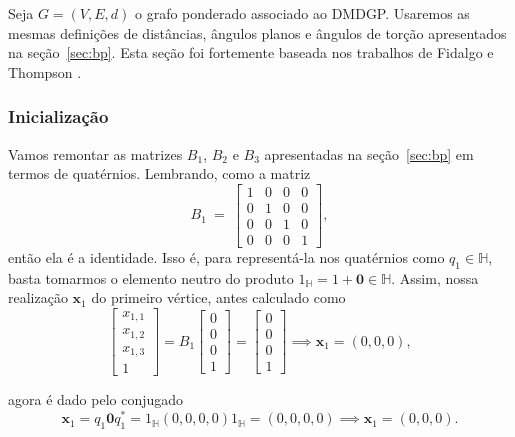 \documentclass[a4paper,12pt]{report}
\theoremstyle{plain}
\theoremstyle{definition}
\begin{document}
	Seja $G = (V,E,d)$ o grafo ponderado associado ao DMDGP. Usaremos as mesmas definições de distâncias, ângulos planos e ângulos de torção apresentados na seção~\ref{sec:bp}. Esta seção foi fortemente baseada nos trabalhos de Fidalgo \cite{agacse?} e Thompson \cite{thompsonBi}.
	
	\subsubsection*{Inicialização}
	
	Vamos remontar as matrizes $B_1$, $B_2$ e $B_3$ apresentadas na seção~\ref{sec:bp} em termos de quatérnios. Lembrando, como a matriz 
	$$B_1\: =\:
	\begin{bmatrix}
		1 & 0 & 0 & 0\\ 
		0 & 1 & 0 & 0\\ 
		0 & 0 & 1 & 0\\ 
		0 & 0 & 0 & 1
	\end{bmatrix},$$
	então ela é a identidade. Isso é, para representá-la nos quatérnios como $q_1 \in \mathbb{H}$, basta tomarmos o elemento neutro do produto $1_\mathbb{H} = 1 + \mathbf 0 \in \mathbb{H}$. Assim, nossa realização $\mathbf x_1$ do primeiro vértice, antes calculado como $$
	\begin{bmatrix}
		x_{1,1}\\ 
		x_{1,2}\\ 
		x_{1,3}\\ 
		1
	\end{bmatrix}
	= B_{1}\begin{bmatrix}
		0\\ 
		0\\ 
		0\\ 
		1
	\end{bmatrix} = 
	\begin{bmatrix}
	0\\ 
	0\\ 
	0\\ 
	1
	\end{bmatrix} \implies \mathbf x_1 = (0,0,0),
	$$
	
	agora é dado pelo conjugado $$\mathbf x_1 = q_1\mathbf 0q_1^* = 1_\mathbb{H}(0,0,0,0)1_\mathbb{H} = (0,0,0,0) \implies \mathbf x_1 = (0,0,0).$$
	
\end{document}
